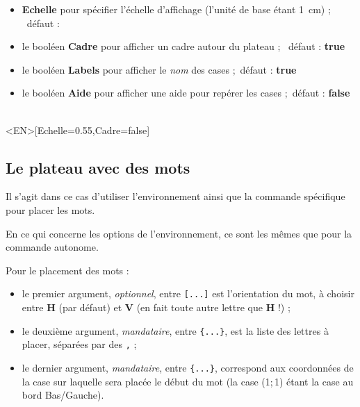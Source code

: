 \documentclass{article}
\newcommand\Cle[1]{{\bfseries\sffamily\textlangle #1\textrangle}}
\begin{document}
\begin{itemize}
	\item \Cle{Echelle} pour spécifier l'échelle d'affichage (l'unité de base étant 1~cm) ; \hfill~défaut : \Cle{1}
	\item le booléen \Cle{Cadre} pour afficher un cadre autour du plateau ; \hfill~défaut : \Cle{true}
	\item le booléen \Cle{Labels} pour afficher le \textit{nom} des cases ;\hfill~défaut : \Cle{true}
	\item le booléen \Cle{Aide} pour afficher une aide pour repérer les cases ;\hfill~défaut : \Cle{false}
\end{itemize}

\begin{PresentationCode}{}
\PlateauScrabble[Labels=false,Echelle=0.55]\\
\PlateauScrabble<EN>[Echelle=0.55,Cadre=false]
\end{PresentationCode}

\newpage

\subsection{Le plateau avec des mots}

Il s'agit dans ce cas d'utiliser l'\textsf{environnement} ainsi que la \textsf{commande} spécifique pour placer les mots.

\smallskip

En ce qui concerne les options de l'\textsf{environnement}, ce sont les mêmes que pour la \textsf{commande} autonome.

\smallskip

Pour le placement des mots :

\begin{itemize}
	\item le premier argument, \textit{optionnel}, entre \texttt{[...]} est l'orientation du mot, à choisir entre \Cle{H} (par défaut) et \Cle{V} (en fait toute autre lettre que \Cle{H} !) ;
	\item le deuxième argument, \textit{mandataire}, entre \texttt{\{...\}}, est la liste des lettres à placer, séparées par des \og \texttt{,} \fg{} ;
	\item le dernier argument, \textit{mandataire}, entre \texttt{\{...\}}, correspond aux coordonnées de la case sur laquelle sera placée le début du mot (la case (1;\,1) étant la case au bord Bas/Gauche).
\end{itemize}
\end{document}
